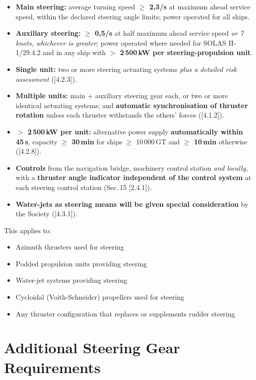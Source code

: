 \documentclass[11pt,a4paper]{report}
\begin{document}
\begin{itemize}[leftmargin=*]
\item \textbf{Main steering:} average turning speed \textbf{$\geq$ 2,3\textdegree/s}
at maximum ahead service speed, within the declared steering angle limits;
power operated for all ships.
\item \textbf{Auxiliary steering:} \textbf{$\geq$ 0,5\textdegree/s} at half maximum
ahead service speed \emph{or 7 knots, whichever is greater}; power operated where
needed for SOLAS II-1/29.4.2 and in any ship with \textbf{$>$ 2\,500\,kW per
steering-propulsion unit}.
\item \textbf{Single unit:} two or more steering actuating systems \emph{plus a
detailed risk assessment} ([4.2.3]).
\item \textbf{Multiple units:} main $+$ auxiliary steering gear each, or two or
more identical actuating systems; and \textbf{automatic synchronisation of
thruster rotation} unless each thruster withstands the others' forces ([4.1.2]).
\item \textbf{$>$ 2\,500\,kW per unit:} alternative power supply
\textbf{automatically within 45\,s}, capacity \textbf{$\geq$ 30\,min} for ships
$\geq$ 10\,000\,GT and \textbf{$\geq$ 10\,min} otherwise ([4.2.8]).
\item \textbf{Controls} from the navigation bridge, machinery control station
\emph{and locally}, with a \textbf{thruster angle indicator independent of the
control system} at each steering control station (Sec.\,15 [2.4.1]).
\item \textbf{Water-jets as steering means will be given special consideration}
by the Society ([4.3.1]).
\end{itemize}

\vspace{2mm}
\noindent This applies to:
\begin{itemize}[leftmargin=*]
\item Azimuth thrusters used for steering
\item Podded propulsion units providing steering
\item Water-jet systems providing steering
\item Cycloidal (Voith-Schneider) propellers used for steering
\item Any thruster configuration that replaces or supplements rudder steering
\end{itemize}

\section{Additional Steering Gear Requirements}
\end{document}
